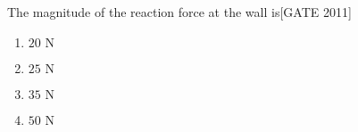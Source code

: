 \item The magnitude of the reaction force at the wall is\hfill{[GATE 2011]}
    \begin{multicols}{4}
        \begin{enumerate}
            \item $20  \text{ N}$
            \item $25  \text{ N}$
            \item $35  \text{ N}$
            \item $50  \text{ N}$
        \end{enumerate}
    \end{multicols}

